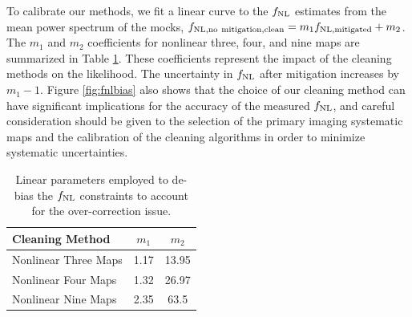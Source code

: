 
To calibrate our methods, we fit a linear curve to the $f_{\rm NL}$ estimates from the mean power spectrum of the mocks, $f_{\rm NL, no~mitigation, clean} = m_{1} f_{\rm NL, mitigated} + m_{2}$. The $m_{1}$ and $m_{2}$ coefficients for nonlinear three, four, and nine maps are summarized in Table \ref{tab:debiasparams}. These coefficients represent the impact of the cleaning methods on the likelihood. The uncertainty in $f_{\rm NL}$ after mitigation increases by $m_{1}-1$. Figure \ref{fig:fnlbias} also shows that the choice of our cleaning method can have significant implications for the accuracy of the measured $f_{\rm NL}$, and careful consideration should be given to the selection of the primary imaging systematic maps and the calibration of the cleaning algorithms in order to minimize systematic uncertainties.


\begin{table}
\begin{center}
\caption{Linear parameters employed to de-bias the $f_{\rm NL}$ constraints to account for the over-correction issue.}\label{tab:debiasparams}
\begin{tabular}{lcc}
\hline
\hline
\textbf{Cleaning Method} & $m_{1}$ & $m_{2}$ \\
\hline
Nonlinear Three Maps & 1.17 & 13.95 \\
Nonlinear Four Maps & 1.32 & 26.97 \\
Nonlinear Nine Maps & 2.35 & 63.5\\
\hline
\end{tabular}
\end{center}
\end{table}

